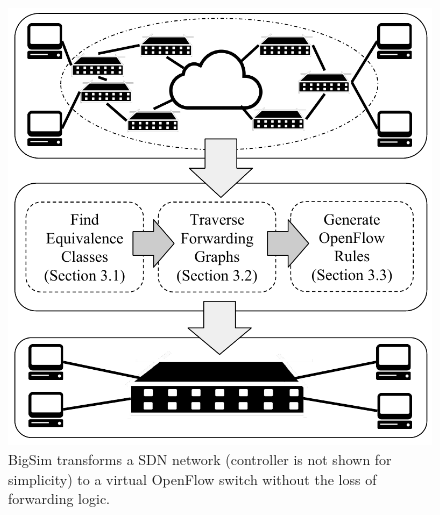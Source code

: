 \begin{figure}[t]
\centering
\includegraphics[scale=.6]{figures/BigSimOverview.pdf}
\caption{BigSim transforms a SDN network (controller is not shown for simplicity) to a
virtual OpenFlow switch without the loss of forwarding logic.}
\label{Fig:BigSimOverview}
\end{figure}

